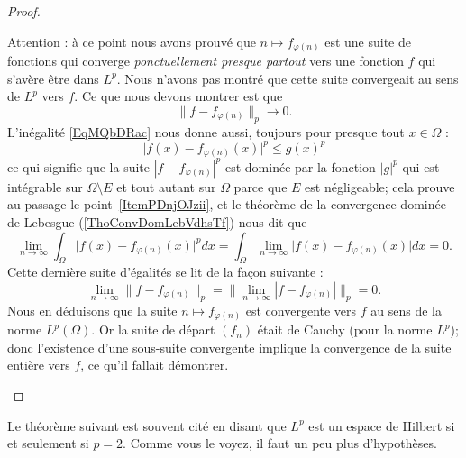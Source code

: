 \begin{proof}
\begin{subproof}
		Attention : à ce point nous avons prouvé que \( n\mapsto f_{\varphi(n)}\) est une suite de fonctions qui converge \emph{ponctuellement presque partout} vers une fonction \( f\) qui s'avère être dans \( L^p\). Nous n'avons pas montré que cette suite convergeait au sens de \( L^p\) vers \( f\). Ce que nous devons montrer est que
		\begin{equation}    \label{EqJLfnEvj}
			\| f-f_{\varphi(n)} \|_p\to 0.
		\end{equation}
		L'inégalité \eqref{EqMQbDRac} nous donne aussi, toujours pour presque tout \( x\in \Omega\) :
		\begin{equation}
			\big| f(x)-f_{\varphi(n)}(x) \big|^p\leq g(x)^p
		\end{equation}
		ce qui signifie que la suite \(    | f-f_{\varphi(n)} |^p    \) est dominée par la fonction \( | g |^p\) qui est intégrable sur \( \Omega\setminus E\) et tout autant sur \( \Omega\) parce que \( E\) est négligeable; cela prouve au passage le point~\ref{ItemPDnjOJzii}, et le théorème de la convergence dominée de Lebesgue (\ref{ThoConvDomLebVdhsTf}) nous dit que
		\begin{equation}
			\lim_{n\to \infty} \int_{\Omega} \big| f(x)-f_{\varphi(n)}(x) \big|^pdx=\int_{\Omega}\lim_{n\to \infty} \big| f(x)-f_{\varphi(n)}(x) \big|dx=0.
		\end{equation}
		Cette dernière suite d'égalités se lit de la façon suivante :
		\begin{equation}
			\lim_{n\to \infty} \| f-f_{\varphi(n)} \|_p=\big\| \lim_{n\to \infty} | f-f_{\varphi(n)} | \big\|_p=0.
		\end{equation}
		Nous en déduisons que la suite \( n\mapsto f_{\varphi(n)}\) est convergente vers \( f\) au sens de la norme \( L^p(\Omega)\). Or la suite de départ \( (f_n)\) était de Cauchy (pour la norme \( L^p\)); donc l'existence d'une sous-suite convergente implique la convergence de la suite entière vers \( f\), ce qu'il fallait démontrer.
	\end{subproof}
\end{proof}

Le théorème suivant est souvent cité en disant que \( L^p\) est un espace de Hilbert si et seulement si \( p=2\). Comme vous le voyez, il faut un peu plus d'hypothèses.

